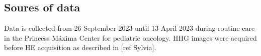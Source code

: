 \subsection{Soures of data}

Data is collected from 26 September 2023 until 13 April 2023 during routine care in the Princess Máxima Center for pediatric oncology.
HHG images were acquired before HE acquisition as described in [ref Sylvia].
